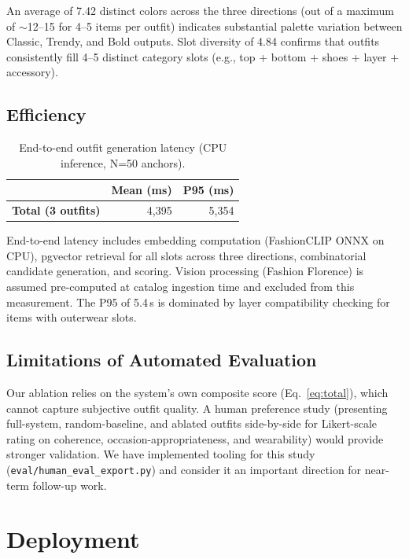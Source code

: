 \documentclass[10pt,twocolumn]{article}
\begin{document}
An average of 7.42 distinct colors across the three directions (out of a
maximum of $\sim$12--15 for 4--5 items per outfit) indicates substantial
palette variation between Classic, Trendy, and Bold outputs.  Slot diversity
of 4.84 confirms that outfits consistently fill 4--5 distinct category
slots (e.g., top + bottom + shoes + layer + accessory).

\subsection{Efficiency}

\begin{table}[t]
\centering
\small
\caption{End-to-end outfit generation latency (CPU inference, N=50 anchors).}
\label{tab:latency}
\begin{tabular}{lrr}
\toprule
& Mean (ms) & P95 (ms) \\
\midrule
\textbf{Total (3 outfits)} & 4,395 & 5,354 \\
\bottomrule
\end{tabular}
\end{table}

\noindent End-to-end latency includes embedding computation (FashionCLIP
ONNX on CPU), pgvector retrieval for all slots across three directions,
combinatorial candidate generation, and scoring.  Vision processing (Fashion
Florence) is assumed pre-computed at catalog ingestion time and excluded
from this measurement.  The P95 of 5.4\,s is dominated by layer
compatibility checking for items with outerwear slots.

\subsection{Limitations of Automated Evaluation}
\label{sec:human_eval}

Our ablation relies on the system's own composite score
(Eq.~\ref{eq:total}), which cannot capture subjective outfit quality.
A human preference study (presenting full-system, random-baseline, and
ablated outfits side-by-side for Likert-scale rating on coherence,
occasion-appropriateness, and wearability) would provide stronger
validation.  We have implemented tooling for this study
(\texttt{eval/human\_eval\_export.py}) and consider it an important
direction for near-term follow-up work.

\section{Deployment}
\label{sec:shopify}
\end{document}
